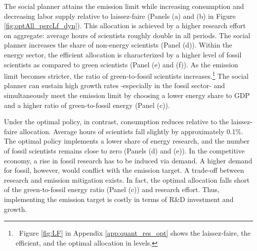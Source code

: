 \begin{figure}[h!!!]
\begin{subfigure}[]{1\textwidth}
\begin{subfigure}[]{0.4\textwidth}
\end{subfigure}
\end{subfigure}
\end{figure} 
%
The social planner attains the emission limit while increasing consumption and decreasing labor supply relative to laissez-faire (Panels (a) and (b) in Figure \ref{fig:optAll_percLf_dyn}). This allocation is achieved by a higher research effort on aggregate: average hours of scientists roughly double in all periods. The social planner increases the share of non-energy scientists (Panel (d)). Within the energy sector, the efficient allocation is characterized by a higher level of fossil scientists as compared to green scientists (Panel (e) and (f)). As the emission limit becomes stricter, the ratio of green-to-fossil scientists increases.\footnote{\ Figure \ref{fig:LF} in Appendix \ref{app:quant_res_opt}  shows the laissez-faire, the efficient, and the optimal allocation in levels.} 
The social planner can sustain high growth rates -especially in the fossil sector- and simultaneously meet the emission limit by choosing a lower energy share to GDP and a higher ratio of green-to-fossil energy (Panel (c)). 


Under the optimal policy, in contrast, consumption reduces relative to the laissez-faire allocation. Average hours of scientists fall slightly by approximately 0.1\%. The optimal policy implements a lower share of energy research, and the number of fossil scientists remains close to zero (Panels (d) and (e)).
In the competitive economy, a rise in fossil research has to be induced via demand. A higher demand for fossil, however, would conflict with the emission target. A trade-off between research and emission mitigation exists.  In fact, the optimal allocation falls short of the green-to-fossil energy ratio (Panel (c)) and research effort. Thus, implementing the emission target is costly in terms of R\&D investment and growth.



